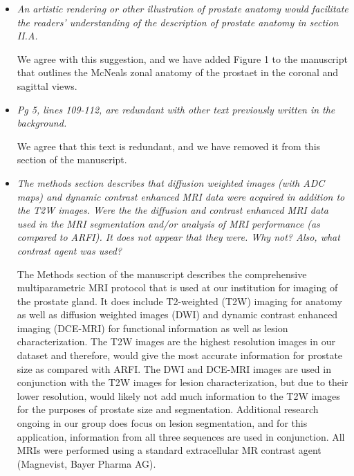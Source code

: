 \documentclass[10pt]{article}
\begin{document}
\begin{itemize}

    \item \textit{An artistic rendering or other illustration of prostate
            anatomy would facilitate the readers' understanding of the
            description of prostate anatomy in section II.A.}

    We agree with this suggestion, and we have added Figure 1 to the manuscript
    that outlines the McNeals zonal anatomy of the prostaet in the coronal and
    sagittal views.

    \item \textit{Pg 5, lines 109-112, are redundant with other text previously
            written in the background.}

    We agree that this text is redundant, and we have removed it from this
    section of the manuscript.

    \item \textit{The methods section describes that diffusion weighted images
            (with ADC maps) and dynamic contrast enhanced MRI data were
            acquired in addition to the T2W images.  Were the the diffusion and
            contrast enhanced MRI data used in the MRI segmentation and/or
            analysis of MRI performance (as compared to ARFI).  It does not
            appear that they were.  Why not?  Also, what contrast agent was
            used?}

    The Methods section of the manuscript describes the comprehensive
    multiparametric MRI protocol that is used at our institution for imaging of
    the prostate gland.  It does include T2-weighted (T2W) imaging for anatomy
    as well as diffusion weighted images (DWI) and dynamic contrast enhanced
    imaging (DCE-MRI) for functional information as well as lesion
    characterization.  The T2W images are the highest resolution images in our
    dataset and therefore, would give the most accurate information for
    prostate size as compared with ARFI.  The DWI and DCE-MRI images are used
    in conjunction with the T2W images for lesion characterization, but due to
    their lower resolution, would likely not add much information to the T2W
    images for the purposes of prostate size and segmentation.  Additional
    research ongoing in our group does focus on lesion segmentation, and for
    this application, information from all three sequences are used in
    conjunction. All MRIs were performed using a standard extracellular MR
    contrast agent (Magnevist, Bayer Pharma AG). 


\end{itemize}
\end{document}
